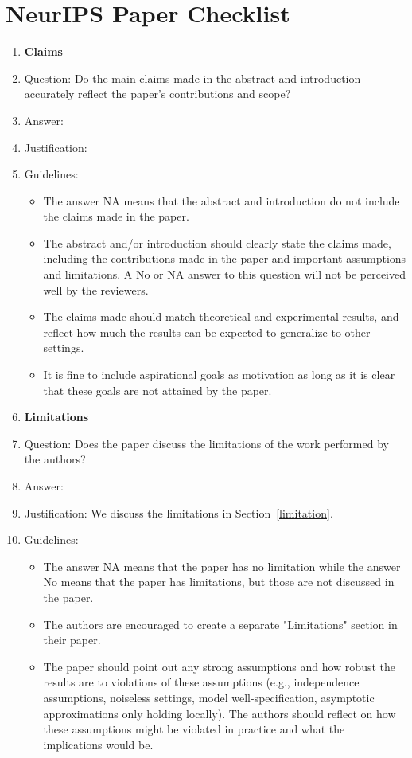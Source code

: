 \documentclass{article}
\begin{document}
\section*{NeurIPS Paper Checklist}
\begin{enumerate}
\item {\bf Claims}
    \item[] Question: Do the main claims made in the abstract and introduction accurately reflect the paper's contributions and scope?
    \item[] Answer: \answerYes{}
    \item[] Justification: \justificationTODO{}
    \item[] Guidelines:
    \begin{itemize}
        \item The answer NA means that the abstract and introduction do not include the claims made in the paper.
        \item The abstract and/or introduction should clearly state the claims made, including the contributions made in the paper and important assumptions and limitations. A No or NA answer to this question will not be perceived well by the reviewers.
        \item The claims made should match theoretical and experimental results, and reflect how much the results can be expected to generalize to other settings.
        \item It is fine to include aspirational goals as motivation as long as it is clear that these goals are not attained by the paper.
    \end{itemize}
\item {\bf Limitations}
    \item[] Question: Does the paper discuss the limitations of the work performed by the authors?
    \item[] Answer: \answerYes{}
    \item[] Justification: We discuss the limitations in Section~\ref{limitation}.
    \item[] Guidelines:
    \begin{itemize}
        \item The answer NA means that the paper has no limitation while the answer No means that the paper has limitations, but those are not discussed in the paper.
        \item The authors are encouraged to create a separate "Limitations" section in their paper.
        \item The paper should point out any strong assumptions and how robust the results are to violations of these assumptions (e.g., independence assumptions, noiseless settings, model well-specification, asymptotic approximations only holding locally). The authors should reflect on how these assumptions might be violated in practice and what the implications would be.

\end{itemize}
\end{enumerate}
\end{document}

